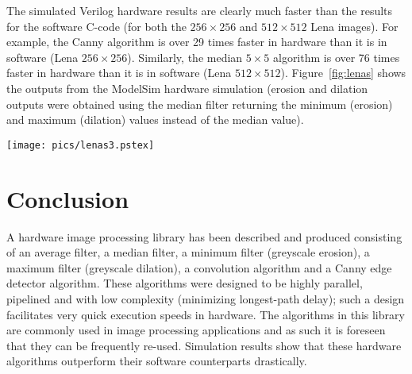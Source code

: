 \documentclass[10pt,twocolumn,letterpaper]{article}
\begin{document}
The simulated Verilog hardware results are clearly much faster than the results for the software C-code (for both the $256\times256$ and 
$512\times512$ Lena images). 
For example, the Canny algorithm is over 29 times faster in hardware 
than it is in software (Lena $256\times256$). 
Similarly, the median $5\times5$ algorithm is over 76 times faster in 
hardware than it is in software (Lena $512\times512$).
Figure~\ref{fig:lenas} shows the outputs from the ModelSim hardware simulation (erosion and dilation outputs were
obtained using the median filter returning the minimum (erosion) and maximum (dilation) values instead of the median value).
\begin{figure*}[!htb]
\begin{center}
\setlength{\abovecaptionskip}{-0.25cm}
        \texttt{[image: pics/lenas3.pstex]}
        \caption{Images processed in ModelSim using Verilog: 
	{\bf (a)} original Lena $256\times256$, {\bf (b)} Lena with salt and pepper noise, {\bf (c)} median $3\times3$ filter applied to Lena with
	salt and pepper noise,
	{\bf (d)} average $3\times3$ filter applied to Lena with salt and pepper noise, 
	{\bf (e)} Gaussian $3\times3$ smoothing (convolution) applied to original Lena,
	{\bf (f)} Canny algorithm applied to original Lena, {\bf (g)} Greyscale erosion (minimum) $3\times3$ applied to original Lena, 
	{\bf (h)} Greyscale dilation (maximum) $3\times3$ applied to original Lena}
        \label{fig:lenas}
\setlength{\abovecaptionskip}{0cm}
\end{center}
\end{figure*}

\section{Conclusion}
A hardware image processing library has been described and produced consisting of an average filter, a median filter, a
minimum filter (greyscale erosion), a maximum filter (greyscale dilation), a convolution algorithm and a Canny
edge detector algorithm. 
These algorithms were designed to be highly parallel, pipelined and with low complexity (minimizing longest-path delay);
such a design facilitates very quick execution speeds in hardware.
The algorithms in this library 
are commonly used in image processing applications and as such
it is foreseen that they can be frequently re-used.
Simulation results show that these hardware algorithms outperform their software
counterparts drastically.


\renewcommand{\baselinestretch}{1}
	\footnotesize


	\normalsize
\renewcommand{\baselinestretch}{1}
\end{document}

